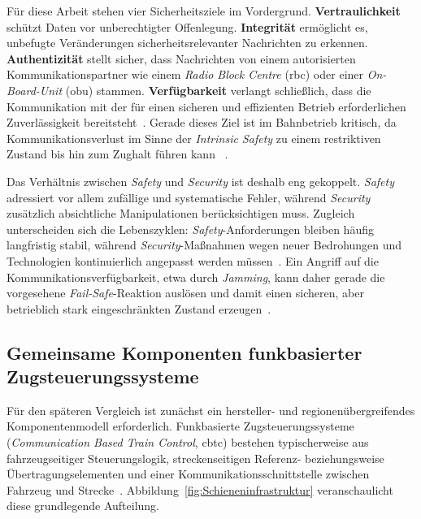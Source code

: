 \documentclass[runningheads]{res/llncs}
\begin{document}
Für diese Arbeit stehen vier Sicherheitsziele im Vordergrund. \textbf{Vertraulichkeit} schützt Daten vor unberechtigter Offenlegung. \textbf{Integrität} ermöglicht es, unbefugte Veränderungen sicherheitsrelevanter Nachrichten zu erkennen. \textbf{Authentizität} stellt sicher, dass Nachrichten von einem autorisierten Kommunikationspartner wie einem \textit{Radio Block Centre} (\gls{rbc}) oder einer \textit{On-Board-Unit} (\gls{obu}) stammen. \textbf{Verfügbarkeit} verlangt schließlich, dass die Kommunikation mit der für einen sicheren und effizienten Betrieb erforderlichen Zuverlässigkeit bereitsteht~\parencite[S. 207]{trinckaufETCS2024}. Gerade dieses Ziel ist im Bahnbetrieb kritisch, da Kommunikationsverlust im Sinne der \textit{Intrinsic Safety} zu einem restriktiven Zustand bis hin zum Zughalt führen kann~\parencite[S. 56]{gaggeroSurvey2024} .

Das Verhältnis zwischen \textit{Safety} und \textit{Security} ist deshalb eng gekoppelt. \textit{Safety} adressiert vor allem zufällige und systematische Fehler, während \textit{Security} zusätzlich absichtliche Manipulationen berücksichtigen muss. Zugleich unterscheiden sich die Lebenszyklen: \textit{Safety}-Anforderungen bleiben häufig langfristig stabil, während \textit{Security}-Maßnahmen wegen neuer Bedrohungen und Technologien kontinuierlich angepasst werden müssen~\parencite[S. 204]{trinckaufETCS2024}. Ein Angriff auf die Kommunikationsverfügbarkeit, etwa durch \textit{Jamming}, kann daher gerade die vorgesehene \textit{Fail-Safe}-Reaktion auslösen und damit einen sicheren, aber betrieblich stark eingeschränkten Zustand erzeugen~\parencite[S. 56--59]{gaggeroSurvey2024}.

\subsection{Gemeinsame Komponenten funkbasierter Zugsteuerungssysteme}
\label{sec:Übersicht_gemeinsamer_Komponenten_funkbasierter_Zugsteuerungssysteme}

Für den späteren Vergleich ist zunächst ein hersteller- und regionenübergreifendes Komponentenmodell erforderlich. Funkbasierte Zugsteuerungssysteme (\textit{Communication Based Train Control}, \gls{cbtc}) bestehen typischerweise aus fahrzeugseitiger Steuerungslogik, streckenseitigen Referenz- beziehungsweise Übertragungselementen und einer Kommunikationsschnittstelle zwischen Fahrzeug und Strecke~\parencite[S. 9--14]{xiangliuCyber2020}. Abbildung~\ref{fig:Schieneninfrastruktur} veranschaulicht diese grundlegende Aufteilung.
\end{document}

